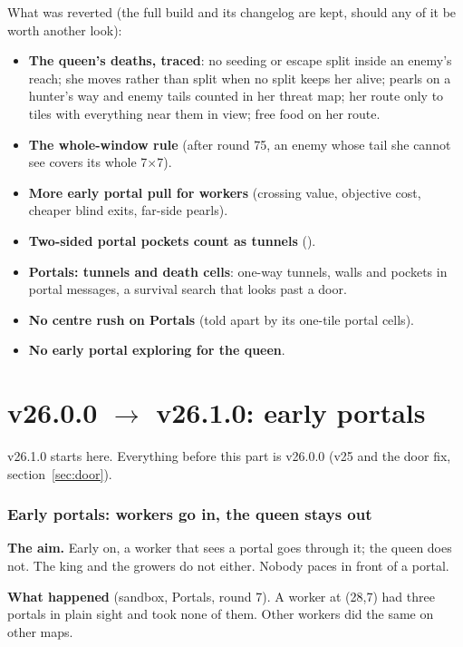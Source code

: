 \documentclass[11pt,a4paper]{article}
\newcommand{\code}[1]{\texttt{\detokenize{#1}}}
\begin{document}
What was reverted (the full build and its changelog are kept, should any of it be worth another look):
\begin{itemize}
      \item \textbf{The queen's deaths, traced}: no seeding or escape split inside an enemy's reach; she moves rather than split
            when no split keeps her alive; pearls on a hunter's way and enemy tails counted in her threat map; her route only to
            tiles with everything near them in view; free food on her route.
      \item \textbf{The whole-window rule} (after round 75, an enemy whose tail she cannot see covers its whole 7$\times$7).
      \item \textbf{More early portal pull for workers} (crossing value, objective cost, cheaper blind exits, far-side pearls).
      \item \textbf{Two-sided portal pockets count as tunnels} (\code{portal_pocket_worth}).
      \item \textbf{Portals: tunnels and death cells}: one-way tunnels, walls and pockets in portal messages, a survival search that
            looks past a door.
      \item \textbf{No centre rush on Portals} (told apart by its one-tile portal cells).
      \item \textbf{No early portal exploring for the queen}.
\end{itemize}

\part{v26.0.0 $\rightarrow$ v26.1.0: early portals}
v26.1.0 starts here. Everything before this part is v26.0.0 (v25 and the door fix, section~\ref{sec:door}).

\section{Early portals: workers go in, the queen stays out}\label{sec:earlyportals}
\textbf{The aim.} Early on, a worker that sees a portal goes through it; the queen does not. The king and the growers do not
either. Nobody paces in front of a portal.

\textbf{What happened} (sandbox, Portals, round 7). A worker at (28,7) had three portals in plain sight and took none of them.
Other workers did the same on other maps.
\end{document}
